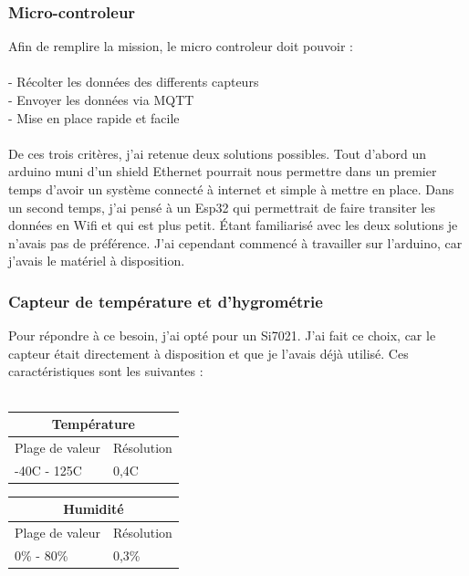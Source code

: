 \documentclass[12pt,french,a4paper]{article}
\begin{document}
\subsubsection{Micro-controleur}

Afin de remplire la mission, le micro controleur doit pouvoir :\\
\\
	- Récolter les données des differents capteurs\\
	- Envoyer les données via MQTT\\
	- Mise en place rapide et facile\\
	\\
De ces trois critères, j'ai retenue deux solutions possibles. 
Tout d'abord un arduino muni d'un shield Ethernet pourrait nous permettre dans un premier temps d'avoir un système 
connecté à internet et simple à mettre en place.
Dans un second temps, j'ai pensé à un Esp32 qui permettrait de faire transiter les données en Wifi et qui est plus petit. 
Étant familiarisé avec les deux solutions je n'avais pas de préférence. J'ai cependant commencé à travailler sur l'arduino, car j'avais le matériel à disposition.

\subsubsection{Capteur de température et d'hygrométrie }
Pour répondre à ce besoin, j'ai opté pour un Si7021. J'ai fait ce choix, car le capteur était directement à disposition et que je l'avais déjà utilisé. Ces caractéristiques sont les suivantes :\\
\\
\begin{center}
    \begin{tabular}{|l|l|}
	\hline
	    \multicolumn{2}{|c|}{Température} \\
	\hline
	    Plage de valeur & Résolution \\
	\hline
	    -40C - 125C & 0,4C \\
	\hline
    \end{tabular}
\end{center}
\begin{center}
    \begin{tabular}{|l|l|}
	\hline
	    \multicolumn{2}{|c|}{Humidité} \\
	\hline
	    Plage de valeur & Résolution \\
	\hline
	    0\% - 80\% & 0,3\% \\
	\hline
    \end{tabular}
\end{center}
\end{document}
